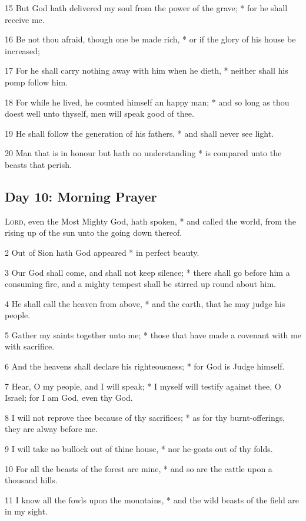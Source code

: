 15 But God hath delivered my soul from the power of the grave; * for he shall receive me.\par
16 Be not thou afraid, though one be made rich, * or if the glory of his house be increased;\par
17 For he shall carry nothing away with him when he dieth, * neither shall his pomp follow him.\par
18 For while he lived, he counted himself an happy man; * and so long as thou doest well unto thyself, men will speak good of thee.\par
19 He shall follow the generation of his fathers, * and shall never see light.\par
20 Man that is in honour but hath no understanding * is compared unto the beasts that perish.
\subsection{Day 10: Morning Prayer}
 {\textsc{Lord}}, even the Most Mighty God, hath spoken, * and called the world, from the rising up of the sun unto the going down thereof.\par
2 Out of Sion hath God appeared * in perfect beauty.\par
3 Our God shall come, and shall not keep silence; * there shall go before him a consuming fire, and a mighty tempest shall be stirred up round about him.\par
4 He shall call the heaven from above, * and the earth, that he may judge his people.\par
5 Gather my saints together unto me; * those that have made a covenant with me with sacrifice.\par
6 And the heavens shall declare his righteousness; * for God is Judge himself.\par
7 Hear, O my people, and I will speak; * I myself will testify against thee, O Israel; for I am God, even thy God.\par
8 I will not reprove thee because of thy sacrifices; * as for thy burnt-offerings, they are alway before me.\par
9 I will take no bullock out of thine house, * nor he-goats out of thy folds.\par
10 For all the beasts of the forest are mine, * and so are the cattle upon a thousand hills.\par
11 I know all the fowls upon the mountains, * and the wild beasts of the field are in my sight.\par
